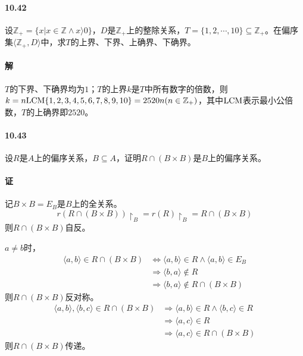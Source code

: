 \documentclass[UTF8]{ctexart}
\newcommand{\sinteger}{\mathbb{Z}}
\begin{document}
\paragraph{10.42} \label{10.42}
    设$\sinteger_+= \{ x| x \in \sinteger \land x \rangle 0 \} $，$D$是$\sinteger_+$上的整除关系，$T = \{ 1,2, \cdots, 10 \} \subseteq \sinteger_+$。在偏序集$ \langle \sinteger_+, D \rangle $中，求$T$的上界、下界、上确界、下确界。
    
\paragraph{解}
    $T$的下界、下确界均为$1$；$T$的上界$k$是$T$中所有数字的倍数，则$k = n{\rm LCM}\{1,2,3,4,5,6,7,8,9,10\}=2520n(n \in \sinteger_+)$，其中${\rm LCM}$表示最小公倍数，$T$的上确界即$2520$。
    
\paragraph{10.43} \label{10.43}
    设$R$是$A$上的偏序关系，$B\subseteq A$，证明$R \cap (B \times B)$是$B$上的偏序关系。

\paragraph{证}
    记$B \times B = E_B$是$B$上的全关系。
    $$r(R \cap (B \times B)) \upharpoonright_B = r(R) \upharpoonright_B = R \cap (B \times B)$$
    则$R \cap (B \times B)$自反。

    $a \neq b$时，
    \begin{align*}
        \langle a,b \rangle \in R \cap (B \times B) & \Longleftrightarrow \langle a,b \rangle \in R \land \langle a,b \rangle \in E_B \\
        & \Longrightarrow \langle b,a \rangle \notin R \\
        & \Longrightarrow \langle b,a \rangle \notin R \cap (B \times B) 
    \end{align*}
    则$R \cap (B \times B)$反对称。
    \begin{align*}
        \langle a,b \rangle , \langle b,c \rangle \in R \cap (B \times B) & \Longrightarrow \langle a,b \rangle \in R \land \langle b,c \rangle \in R \\
        & \Longrightarrow \langle a,c \rangle \in R \\
        & \Longrightarrow \langle a,c \rangle \in R \cap (B \times B) 
    \end{align*}    
    则$R \cap (B \times B)$传递。
\end{document}
